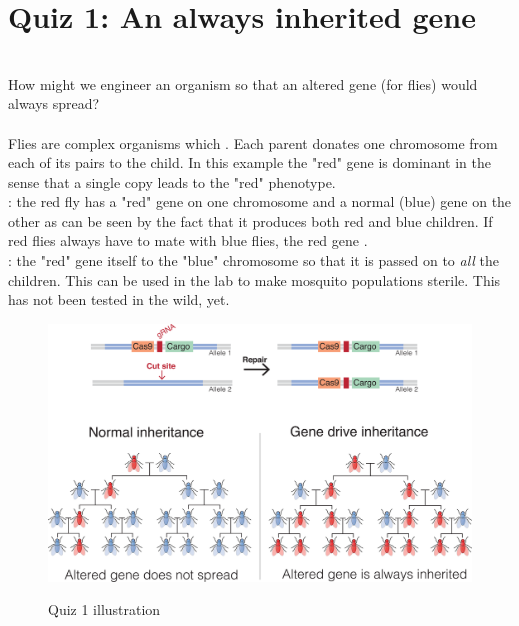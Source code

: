 \section{Quiz 1: An always inherited gene}
 \\ [.1in]
How might we engineer an organism so that an altered gene (for flies) would always spread? \\ [.2in]
 \\ [.1in]
Flies are complex organisms which . Each parent donates one chromosome from each of its pairs to the child. In this example the "red" gene is dominant in the sense that a single copy leads to the "red" phenotype.\\[.2in]
: the red fly has a "red" gene on one chromosome and a normal (blue) gene on the other as can be seen by the fact that it produces both red and blue children. If red flies always have to mate with blue flies, the red gene .\\[.2in]
: the "red" gene  itself to the "blue" chromosome so that it is passed on to \textit{all} the children. This can be used in the lab to make mosquito populations sterile. This has not been tested in the wild, yet.
\begin{figure}[h]
\centering
\includegraphics[width=1\textwidth]{images/Gene_Drive.png}\\[.2in]
\caption{Quiz 1 illustration} 
\end{figure}
\newpage
